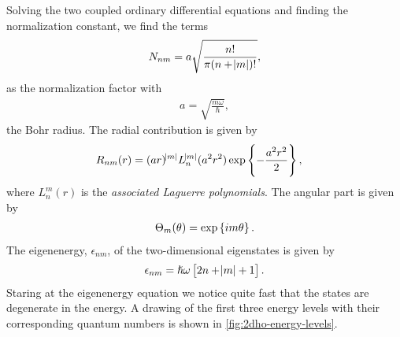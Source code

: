         Solving the two coupled ordinary differential equations and finding the
        normalization constant, we find the terms
        \begin{align}
            N_{nm} = a\sqrt{\frac{n!}{\pi(n + \abs{m})!}},
        \end{align}
        as the normalization factor with
        \begin{align}
            a = \sqrt{\frac{m\omega}{\hslash}},
        \end{align}
        the Bohr radius. The radial contribution is given by
        \begin{align}
            R_{nm}(r)
            &= (ar)^{\abs{m}}L^{\abs{m}}_{n}(a^2r^2)
            \exp\left\{ -\frac{a^2 r^2}{2} \right\},
        \end{align}
        where $L^{m}_{n}(r)$ is the \emph{associated Laguerre polynomials}. The
        angular part is given by
        \begin{align}
            \Theta_m(\theta) = \exp\left\{ im\theta \right\}.
        \end{align}
        The eigenenergy, $\epsilon_{nm}$, of the two-dimensional eigenstates is
        given by
        \begin{align}
            \epsilon_{nm} = \hslash\omega\left[ 
                2n + \abs{m} + 1
             \right].
        \end{align}
        Staring at the eigenenergy equation we notice quite fast that the states
        are degenerate in the energy. A drawing of the first three energy levels
        with their corresponding quantum numbers is shown in
        \autoref{fig:2dho-energy-levels}.
